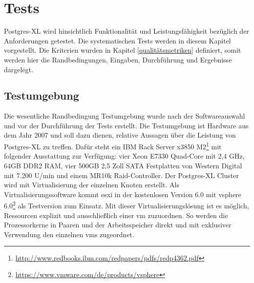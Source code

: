 

\chapter{Tests}
\label{chapter:tests}
Postgres-XL wird hinsichtlich Funktionalität und Leistungsfähigkeit bezüglich der Anforderungen getestet.
Die systematischen Tests werden in diesem Kapitel vorgestellt.
Die Kriterien wurden in Kapitel \ref{qualitätsmetriken} definiert, somit werden hier die Randbedingungen, Eingaben, Durchführung und Ergebnisse dargelegt.

\section{Testumgebung}
Die wesentliche Randbedingung Testumgebung wurde nach der Softwareauswahl und vor der Durchführung der Tests erstellt.
Die Testumgebung ist Hardware aus dem Jahr 2007 und soll dazu dienen, relative Aussagen über die Leistung von Postgres-XL zu treffen.
Dafür steht ein IBM Rack Server x3850 M2\footnote{\url{http://www.redbooks.ibm.com/redpapers/pdfs/redp4362.pdf}} mit folgender Ausstattung zur Verfügung:
vier Xeon E7330 Quad-Core mit 2,4 GHz, 64GB DDR2 RAM, vier 500GB 2,5 Zoll SATA Festplatten von Western Digital mit 7.200 U/min und einem MR10k Raid-Controller.
Der Postgres-XL Cluster wird mit Virtualisierung der einzelnen Knoten erstellt.
Als Virtualisierungssoftware kommt \Gls{esxi} in der kostenlosen Version 6.0 mit \Gls{vsphere} 6.0\footnote{\url{https://www.vmware.com/de/products/vsphere}} als Testversion zum Einsatz.
Mit dieser Virtualisierungslösung ist es möglich, Ressourcen explizit und ausschließlich einer \Gls{vm} zuzuordnen.
So werden die Prozessorkerne in Paaren und der Arbeitsspeicher direkt und mit exklusiver Verwendung den einzelnen \Gls{vm}s zugeordnet.

